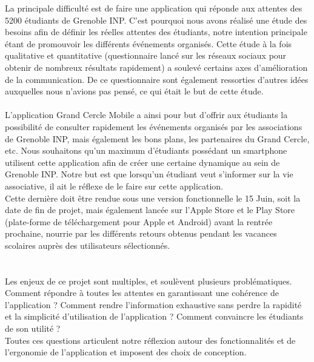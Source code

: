 \documentclass[a4paper,11px]{article}
\begin{document}
\indent La principale difficulté est de faire une application qui réponde aux attentes des 5200 étudiants de Grenoble INP. C'est pourquoi nous avons réalisé une étude des besoins afin de définir les réelles attentes des étudiants, notre intention principale étant de promouvoir les différents événements organisés. Cette étude à la fois qualitative et quantitative (questionnaire lancé sur les réseaux sociaux pour obtenir de nombreux résultats rapidement) a soulevé certains axes d'amélioration de la communication. De ce questionnaire sont également ressorties d'autres idées auxquelles nous n'avions pas pensé, ce qui était le but de cette étude.\\
\\
\indent L'application Grand Cercle Mobile a ainsi pour but d'offrir aux étudiants la possibilité de consulter rapidement les événements organisés par les associations de Grenoble INP, mais également les bons plans, les partenaires du Grand Cercle, etc. Nous souhaitons qu'un maximum d'étudiants possédant un smartphone utilisent cette application afin de créer une certaine dynamique au sein de Grenoble INP. Notre but est que lorsqu'un étudiant veut s'informer sur la vie associative, il ait le réflexe de le faire sur cette application.\\
\indent Cette dernière doit être rendue sous une version fonctionnelle le 15 Juin, soit la date de fin de projet, mais également lancée sur l'Apple Store et le Play Store (plate-forme de téléchargement pour Apple et Android) avant la rentrée prochaine, nourrie par les différents retours obtenus pendant les vacances scolaires auprès des utilisateurs sélectionnés.\\
\\
\\
\indent Les enjeux de ce projet sont multiples, et soulèvent plusieurs problématiques. Comment répondre à toutes les attentes en garantissant une cohérence de l'application ? Comment rendre l'information exhaustive sans perdre la rapidité et la simplicité d'utilisation de l'application ? Comment convaincre les étudiants de son utilité ?\\
Toutes ces questions articulent notre réflexion autour des fonctionnalités et de l'ergonomie de l'application et imposent des choix de conception.\\
\vspace*{\fill}
\newpage

\end{document}
